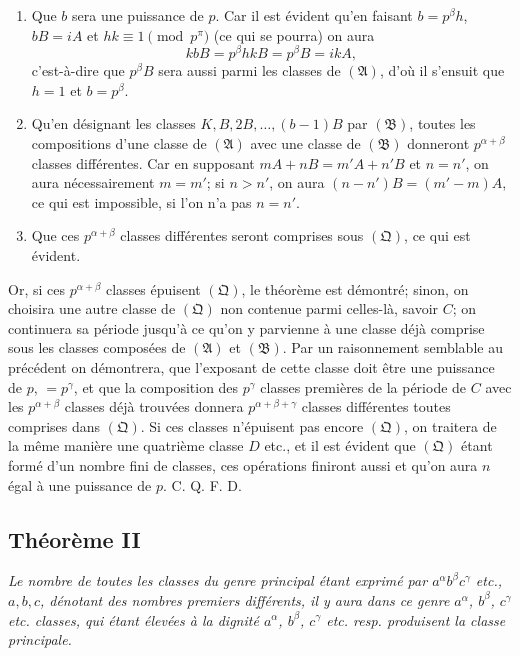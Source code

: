 \documentclass[12pt]{article}
\begin{document}
\begin{enumerate}[label=\arabic*\textsuperscript{o}.]
\item Que $b$ sera une puissance de $p$. Car il est évident qu'en faisant $b=p^\beta h$, $bB=iA$ et $hk\equiv 1\pmod {p^\pi}$ (ce qui se pourra) on aura
\[
kbB=p^\beta hkB=p^\beta B=ikA,
\]
c'est-à-dire que $p^\beta B$ sera aussi parmi les classes de $(\mathfrak A)$, d'où il s'ensuit que $h=1$ et $b=p^\beta$.

\item Qu'en désignant les classes $K,B,2B,\ldots,(b-1)B$ par $(\mathfrak B)$, toutes les compositions d'une classe de $(\mathfrak A)$ avec une classe de $(\mathfrak B)$ donneront $p^{\alpha+\beta}$ classes différentes. Car en supposant $mA+nB=m'A+n'B$ et $n=n'$, on aura nécessairement $m=m'$; si $n>n'$, on aura $(n-n')B=(m'-m)A$, ce qui est impossible, si l'on n'a pas $n=n'$.

\item Que ces $p^{\alpha+\beta}$ classes différentes seront comprises sous $(\mathfrak Q)$, ce qui est évident.
\end{enumerate}

Or, si ces $p^{\alpha+\beta}$ classes épuisent $(\mathfrak Q)$, le théorème est démontré; sinon, on choisira une autre classe de $(\mathfrak Q)$ non contenue parmi celles-là, savoir $C$; on continuera sa période jusqu'à ce qu'on y parvienne à une classe déjà comprise sous les classes composées de $(\mathfrak A)$ et $(\mathfrak B)$. Par un raisonnement semblable au précédent on démontrera, que l'exposant de cette classe doit être une puissance de $p$, $=p^\gamma$, et que la composition des $p^\gamma$ classes premières de la période de $C$ avec les $p^{\alpha+\beta}$ classes déjà trouvées donnera $p^{\alpha+\beta+\gamma}$ classes différentes toutes comprises dans $(\mathfrak Q)$. Si ces classes n'épuisent pas encore $(\mathfrak Q)$, on traitera de la même manière une quatrième classe $D$ etc., et il est évident que $(\mathfrak Q)$ étant formé d'un nombre fini de classes, ces opérations finiront aussi et qu'on aura $n$ égal à une puissance de $p$. C. Q. F. D.

\subsection*{Théorème II}

\emph{Le nombre de toutes les classes du genre principal étant exprimé par $a^\alpha b^\beta c^\gamma$ etc., $a,b,c$, dénotant des nombres premiers différents, il y aura dans ce genre $a^\alpha$, $b^\beta$, $c^\gamma$ etc. classes, qui étant élevées à la dignité $a^\alpha$, $b^\beta$, $c^\gamma$ etc. resp. produisent la classe principale.}
\end{document}
